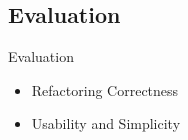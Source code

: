\documentclass[xcolor=dvipsnames]{beamer}
\begin{document}
\subsection{Evaluation}
\begin{frame}{Evaluation}

\begin{itemize}
\item Refactoring Correctness
\item Usability and Simplicity
\end{itemize}
\end{frame}


\end{document}

